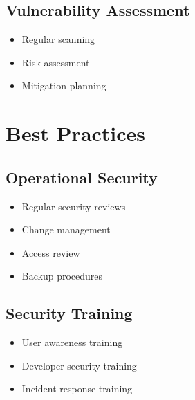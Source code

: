 \documentclass{article}
\begin{document}
\subsection{Vulnerability Assessment}
\begin{itemize}
    \item Regular scanning
    \item Risk assessment
    \item Mitigation planning
\end{itemize}

\section{Best Practices}

\subsection{Operational Security}
\begin{itemize}
    \item Regular security reviews
    \item Change management
    \item Access review
    \item Backup procedures
\end{itemize}

\subsection{Security Training}
\begin{itemize}
    \item User awareness training
    \item Developer security training
    \item Incident response training
\end{itemize}
\end{document}
